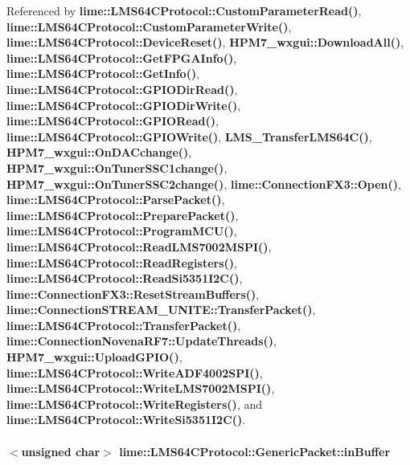 Referenced by {\bf lime\+::\+L\+M\+S64\+C\+Protocol\+::\+Custom\+Parameter\+Read()}, {\bf lime\+::\+L\+M\+S64\+C\+Protocol\+::\+Custom\+Parameter\+Write()}, {\bf lime\+::\+L\+M\+S64\+C\+Protocol\+::\+Device\+Reset()}, {\bf H\+P\+M7\+\_\+wxgui\+::\+Download\+All()}, {\bf lime\+::\+L\+M\+S64\+C\+Protocol\+::\+Get\+F\+P\+G\+A\+Info()}, {\bf lime\+::\+L\+M\+S64\+C\+Protocol\+::\+Get\+Info()}, {\bf lime\+::\+L\+M\+S64\+C\+Protocol\+::\+G\+P\+I\+O\+Dir\+Read()}, {\bf lime\+::\+L\+M\+S64\+C\+Protocol\+::\+G\+P\+I\+O\+Dir\+Write()}, {\bf lime\+::\+L\+M\+S64\+C\+Protocol\+::\+G\+P\+I\+O\+Read()}, {\bf lime\+::\+L\+M\+S64\+C\+Protocol\+::\+G\+P\+I\+O\+Write()}, {\bf L\+M\+S\+\_\+\+Transfer\+L\+M\+S64\+C()}, {\bf H\+P\+M7\+\_\+wxgui\+::\+On\+D\+A\+Cchange()}, {\bf H\+P\+M7\+\_\+wxgui\+::\+On\+Tuner\+S\+S\+C1change()}, {\bf H\+P\+M7\+\_\+wxgui\+::\+On\+Tuner\+S\+S\+C2change()}, {\bf lime\+::\+Connection\+F\+X3\+::\+Open()}, {\bf lime\+::\+L\+M\+S64\+C\+Protocol\+::\+Parse\+Packet()}, {\bf lime\+::\+L\+M\+S64\+C\+Protocol\+::\+Prepare\+Packet()}, {\bf lime\+::\+L\+M\+S64\+C\+Protocol\+::\+Program\+M\+C\+U()}, {\bf lime\+::\+L\+M\+S64\+C\+Protocol\+::\+Read\+L\+M\+S7002\+M\+S\+P\+I()}, {\bf lime\+::\+L\+M\+S64\+C\+Protocol\+::\+Read\+Registers()}, {\bf lime\+::\+L\+M\+S64\+C\+Protocol\+::\+Read\+Si5351\+I2\+C()}, {\bf lime\+::\+Connection\+F\+X3\+::\+Reset\+Stream\+Buffers()}, {\bf lime\+::\+Connection\+S\+T\+R\+E\+A\+M\+\_\+\+U\+N\+I\+T\+E\+::\+Transfer\+Packet()}, {\bf lime\+::\+L\+M\+S64\+C\+Protocol\+::\+Transfer\+Packet()}, {\bf lime\+::\+Connection\+Novena\+R\+F7\+::\+Update\+Threads()}, {\bf H\+P\+M7\+\_\+wxgui\+::\+Upload\+G\+P\+I\+O()}, {\bf lime\+::\+L\+M\+S64\+C\+Protocol\+::\+Write\+A\+D\+F4002\+S\+P\+I()}, {\bf lime\+::\+L\+M\+S64\+C\+Protocol\+::\+Write\+L\+M\+S7002\+M\+S\+P\+I()}, {\bf lime\+::\+L\+M\+S64\+C\+Protocol\+::\+Write\+Registers()}, and {\bf lime\+::\+L\+M\+S64\+C\+Protocol\+::\+Write\+Si5351\+I2\+C()}.

\paragraph[{in\+Buffer}]{$<$unsigned char$>$ lime\+::\+L\+M\+S64\+C\+Protocol\+::\+Generic\+Packet\+::in\+Buffer}\label{structlime_1_1LMS64CProtocol_1_1GenericPacket_a9a66f5bcc21902076f75f4071b12aa3a}


